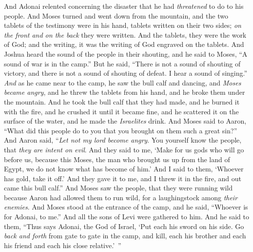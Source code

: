 \begin{biblechapter}
\verse And Adonai relented concerning the disaster that he had \textit{threatened} to do to his people.
\verse And Moses turned and went down from the mountain, and the two tablets of the testimony were in his hand, tablets written on their two sides; \textit{on the front and on the back} they were written.
\verse And the tablets, they were the work of God; and the writing, it was the writing of God engraved on the tablets.
\verse And Joshua heard the sound of the people in their shouting, and he said to Moses, “A sound of war is in the camp.”
\verse But he said, “There is not a sound of shouting of victory, and there is not a sound of shouting of defeat. I hear a sound of singing.”
\verse \textit{And} as he came near to the camp, he saw the bull calf and dancing, and \textit{Moses became angry}, and he threw the tablets from his hand, and he broke them under the mountain.
\verse And he took the bull calf that they had made, and he burned it with the fire, and he crushed it until it became fine, and he scattered it on the surface of the water, and he made the \textit{Israelites} drink.
\verse And Moses said to Aaron, “What did this people do to you that you brought on them such a great sin?”
\verse And Aaron said, “\textit{Let not my lord become angry}. You yourself know the people, that \textit{they are intent on evil}.
\verse And they said to me, ‘Make for us gods who will go before us, because this Moses, the man who brought us up from the land of Egypt, we do not know what has become of him.’
\verse And I said to them, ‘Whoever has gold, take it off.’ And they gave it to me, and I threw it in the fire, and out came this bull calf.”
\verse And Moses saw the people, that they were running wild because Aaron had allowed them to run wild, for a laughingstock among \textit{their enemies}.
\verse And Moses stood at the entrance of the camp, and he said, “Whoever is for Adonai, to me.” And all the sons of Levi were gathered to him.
\verse And he said to them, “Thus says Adonai, the God of Israel, ‘Put each his sword on his side. Go \textit{back and forth} from gate to gate in the camp, and kill, each his brother and each his friend and each his close relative.’ ”

\end{biblechapter}
